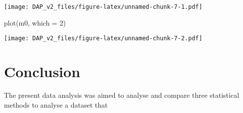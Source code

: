 \documentclass[
]{article}
\newenvironment{Shaded}{\begin{snugshade}}{\end{snugshade}}
\newcommand{\AttributeTok}[1]{\textcolor[rgb]{0.77,0.63,0.00}{#1}}
\newcommand{\DecValTok}[1]{\textcolor[rgb]{0.00,0.00,0.81}{#1}}
\newcommand{\FunctionTok}[1]{\textcolor[rgb]{0.00,0.00,0.00}{#1}}
\newcommand{\NormalTok}[1]{#1}
\begin{document}
\texttt{[image: DAP\_v2\_files/figure-latex/unnamed-chunk-7-1.pdf]}

\begin{Shaded}
\begin{Highlighting}[]
\FunctionTok{plot}\NormalTok{(m0, }\AttributeTok{which =} \DecValTok{2}\NormalTok{)}
\end{Highlighting}
\end{Shaded}

\texttt{[image: DAP\_v2\_files/figure-latex/unnamed-chunk-7-2.pdf]}

\hypertarget{conclusion}{%
\section{Conclusion}\label{conclusion}}

The present data analysis was aimed to analyse and compare three
statistical methods to analyse a dataset that
\end{document}
